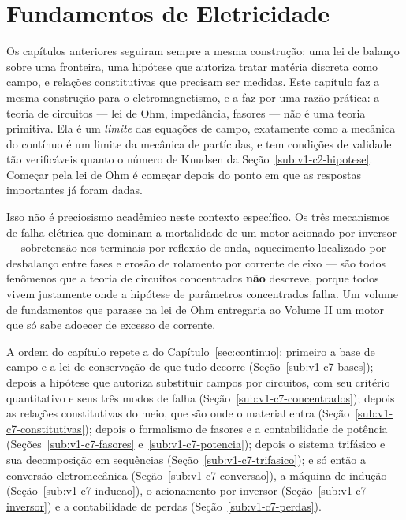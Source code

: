 \documentclass[12pt,a4paper]{article}
\numberwithin{equation}{section}
\numberwithin{table}{section}
\numberwithin{figure}{section}
\begin{document}
\section{Fundamentos de Eletricidade}\label{sec:eletrica}

Os capítulos anteriores seguiram sempre a mesma construção: uma lei de balanço
sobre uma fronteira, uma hipótese que autoriza tratar matéria discreta como
campo, e relações constitutivas que precisam ser medidas. Este capítulo faz a
mesma construção para o eletromagnetismo, e a faz por uma razão prática: a
teoria de circuitos --- lei de Ohm, impedância, fasores --- não é uma teoria
primitiva. Ela é um \emph{limite} das equações de campo, exatamente como a
mecânica do contínuo é um limite da mecânica de partículas, e tem condições de
validade tão verificáveis quanto o número de Knudsen da
Seção~\ref{sub:v1-c2-hipotese}. Começar pela lei de Ohm é começar depois do
ponto em que as respostas importantes já foram dadas.

Isso não é preciosismo acadêmico neste contexto específico. Os três mecanismos
de falha elétrica que dominam a mortalidade de um motor acionado por inversor
--- sobretensão nos terminais por reflexão de onda, aquecimento localizado por
desbalanço entre fases e erosão de rolamento por corrente de eixo --- são todos
fenômenos que a teoria de circuitos concentrados \textbf{não} descreve, porque
todos vivem justamente onde a hipótese de parâmetros concentrados falha. Um
volume de fundamentos que parasse na lei de Ohm entregaria ao Volume II um
motor que só sabe adoecer de excesso de corrente.

A ordem do capítulo repete a do Capítulo~\ref{sec:continuo}: primeiro a base
de campo e a lei de conservação de que tudo decorre
(Seção~\ref{sub:v1-c7-bases}); depois a hipótese que autoriza substituir campos
por circuitos, com seu critério quantitativo e seus três modos de falha
(Seção~\ref{sub:v1-c7-concentrados}); depois as relações constitutivas do meio,
que são onde o material entra (Seção~\ref{sub:v1-c7-constitutivas}); depois o
formalismo de fasores e a contabilidade de potência
(Seções~\ref{sub:v1-c7-fasores} e~\ref{sub:v1-c7-potencia}); depois o sistema
trifásico e sua decomposição em sequências
(Seção~\ref{sub:v1-c7-trifasico}); e só então a conversão eletromecânica
(Seção~\ref{sub:v1-c7-conversao}), a máquina de indução
(Seção~\ref{sub:v1-c7-inducao}), o acionamento por inversor
(Seção~\ref{sub:v1-c7-inversor}) e a contabilidade de perdas
(Seção~\ref{sub:v1-c7-perdas}).
\end{document}
